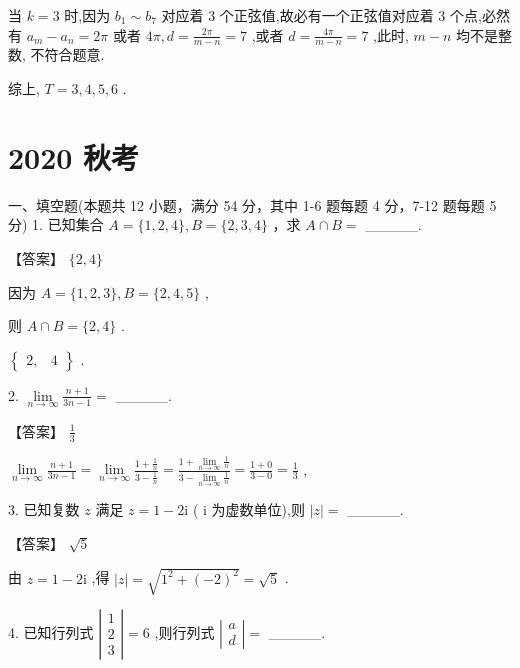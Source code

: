 \documentclass[10pt]{article}
\begin{document}
当 \(k = 3\) 时,因为 \({b}_{1} \sim  {b}_{7}\) 对应着 3 个正弦值,故必有一个正弦值对应着 3 个点,必然有 \({a}_{m} - {a}_{n} = {2\pi }\) 或者 \({4\pi },d = \frac{2\pi }{m - n} = 7\) ,或者 \(d = \frac{4\pi }{m - n} = 7\) ,此时, \(m - n\) 均不是整数, 不符合题意.

综上, \(T = 3,4,5,6\) .

\section*{2020 秋考}

一、填空题(本题共 12 小题，满分 54 分，其中 1-6 题每题 4 分，7-12 题每题 5 分) 1. 已知集合 \(A = \{ 1,2,4\} ,B = \{ 2,3,4\}\) ，求 \(A \cap  B =\) \_\_\_\_\_.

【答案】 \(\{ 2,4\}\)

因为 \(A = \{ 1,2,3\} ,B = \{ 2,4,5\}\) ,

则 \(A \cap  B = \{ 2,4\}\) .

\(\left\{  \begin{array}{ll} 2, & 4 \end{array}\right\}\) .

2. \(\mathop{\lim }\limits_{{n \rightarrow  \infty }}\frac{n + 1}{{3n} - 1} =\) \_\_\_\_\_.

【答案】 \(\frac{1}{3}\)

\(\mathop{\lim }\limits_{{n \rightarrow  \infty }}\frac{n + 1}{{3n} - 1} = \mathop{\lim }\limits_{{n \rightarrow  \infty }}\frac{1 + \frac{1}{n}}{3 - \frac{1}{n}} = \frac{1 + \mathop{\lim }\limits_{{n \rightarrow  \infty }}\frac{1}{n}}{3 - \mathop{\lim }\limits_{{n \rightarrow  \infty }}\frac{1}{n}} = \frac{1 + 0}{3 - 0} = \frac{1}{3}\) ,

3. 已知复数 \(z\) 满足 \(z = 1 - 2\mathrm{i}\) ( \(\mathrm{i}\) 为虚数单位),则 \(\left| z\right|  =\) \_\_\_\_\_.

【答案】 \(\sqrt{5}\)

由 \(z = 1 - 2\mathrm{i}\) ,得 \(\left| z\right|  = \sqrt{{1}^{2} + {\left( -2\right) }^{2}} = \sqrt{5}\) .

4. 已知行列式 \(\left| \begin{array}{l} 1 \\  2 \\  3 \end{array}\right|  = 6\) ,则行列式 \(\left| \begin{array}{l} a \\  d \end{array}\right|  =\) \_\_\_\_\_.
\end{document}
